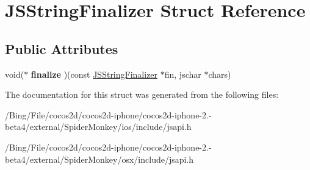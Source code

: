 \hypertarget{struct_j_s_string_finalizer}{\section{J\-S\-String\-Finalizer Struct Reference}
\label{struct_j_s_string_finalizer}
}
\subsection*{Public Attributes}
\begin{DoxyCompactItemize}
\item 
\hypertarget{struct_j_s_string_finalizer_a0c98e561374e8106fcfcebaa71bf78ea}{void($\ast$ {\bfseries finalize} )(const \hyperlink{struct_j_s_string_finalizer}{J\-S\-String\-Finalizer} $\ast$fin, jschar $\ast$chars)}\label{struct_j_s_string_finalizer_a0c98e561374e8106fcfcebaa71bf78ea}

\end{DoxyCompactItemize}


The documentation for this struct was generated from the following files\-:\begin{DoxyCompactItemize}
\item 
/\-Bing/\-File/cocos2d/cocos2d-\/iphone/cocos2d-\/iphone-\/2.-\/beta4/external/\-Spider\-Monkey/ios/include/jsapi.\-h\item 
/\-Bing/\-File/cocos2d/cocos2d-\/iphone/cocos2d-\/iphone-\/2.-\/beta4/external/\-Spider\-Monkey/osx/include/jsapi.\-h\end{DoxyCompactItemize}

